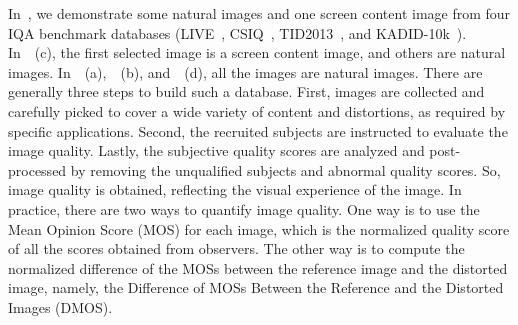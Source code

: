 	In~, we demonstrate some natural images and one screen content image from four IQA benchmark databases (LIVE~\citep{livedataset}, CSIQ~\citep{larson2010most}, TID2013~\citep{ponomarenko2015image}, and KADID-10k~\citep{kadid10k}). In~~(c), the first selected image is a screen content image, and others are natural images. In~~(a),~~(b), and~~(d), all the images are natural images. There are generally three steps to build such a database. First, images are collected and carefully picked to cover a wide variety of content and distortions, as required by specific applications. Second, the recruited subjects are instructed to evaluate the image quality. Lastly, the subjective quality scores are analyzed and post-processed by removing the unqualified subjects and abnormal quality scores. So, image quality is obtained, reflecting the visual experience of the image. In practice, there are two ways to quantify image quality. One way is to use the Mean Opinion Score (MOS) for each image, which is the normalized quality score of all the scores obtained from observers. The other way is to compute the normalized difference of the MOSs between the reference image and the distorted image, namely, the Difference of MOSs Between the Reference and the Distorted Images (DMOS).
